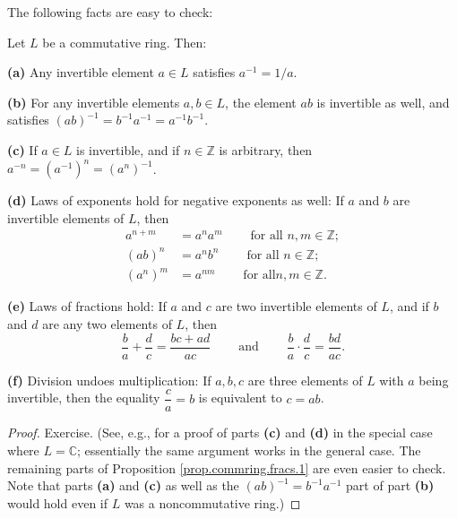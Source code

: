 The following facts are easy to check:

\begin{proposition}
\label{prop.commring.fracs.1}Let $L$ be a commutative ring. Then: \medskip

\textbf{(a)} Any invertible element $a\in L$ satisfies $a^{-1}=1/a$. \medskip

\textbf{(b)} For any invertible elements $a,b\in L$, the element $ab$ is
invertible as well, and satisfies $\left(  ab\right)  ^{-1}=b^{-1}%
a^{-1}=a^{-1}b^{-1}$. \medskip

\textbf{(c)} If $a\in L$ is invertible, and if $n\in\mathbb{Z}$ is arbitrary,
then $a^{-n}=\left(  a^{-1}\right)  ^{n}=\left(  a^{n}\right)  ^{-1}$.
\medskip

\textbf{(d)} Laws of exponents hold for negative exponents as well: If $a$ and
$b$ are invertible elements of $L$, then%
\begin{align*}
a^{n+m}  &  =a^{n}a^{m}\ \ \ \ \ \ \ \ \ \ \text{for all }n,m\in\mathbb{Z};\\
\left(  ab\right)  ^{n}  &  =a^{n}b^{n}\ \ \ \ \ \ \ \ \ \ \text{for all }%
n\in\mathbb{Z};\\
\left(  a^{n}\right)  ^{m}  &  =a^{nm}\ \ \ \ \ \ \ \ \ \ \text{for all
}n,m\in\mathbb{Z}.
\end{align*}


\textbf{(e)} Laws of fractions hold: If $a$ and $c$ are two invertible
elements of $L$, and if $b$ and $d$ are any two elements of $L$, then
\[
\dfrac{b}{a}+\dfrac{d}{c}=\dfrac{bc+ad}{ac}\ \ \ \ \ \ \ \ \ \ \text{and}%
\ \ \ \ \ \ \ \ \ \ \dfrac{b}{a}\cdot\dfrac{d}{c}=\dfrac{bd}{ac}.
\]


\textbf{(f)} Division undoes multiplication: If $a,b,c$ are three elements of
$L$ with $a$ being invertible, then the equality $\dfrac{c}{a}=b$ is
equivalent to $c=ab$.
\end{proposition}

\begin{proof}
Exercise. (See, e.g., \cite[solution to Exercise 4.1.1]{19s} for a proof of
parts \textbf{(c)} and \textbf{(d)} in the special case where $L=\mathbb{C}$;
essentially the same argument works in the general case. The remaining parts
of Proposition \ref{prop.commring.fracs.1} are even easier to check. Note that
parts \textbf{(a)} and \textbf{(c)} as well as the $\left(  ab\right)
^{-1}=b^{-1}a^{-1}$ part of part \textbf{(b)} would hold even if $L$ was a
noncommutative ring.)
\end{proof}

